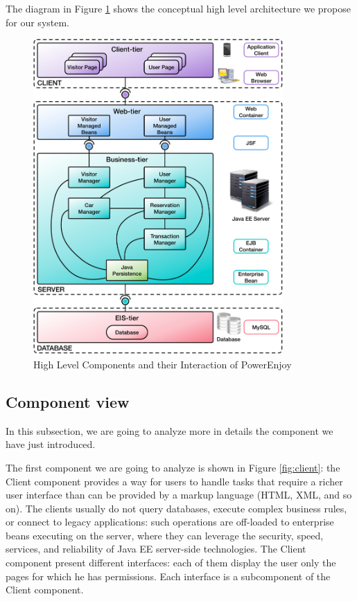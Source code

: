 The diagram in Figure \ref{fig:high-comp} shows the conceptual high level architecture we propose for our system.
\vspace{18pt}
\begin{figure}[htbp]
\centering
\includegraphics[width=0.85\textwidth]{Images/HighLevelComponents.pdf}
\vspace{10pt}
\caption{High Level Components and their Interaction of PowerEnjoy}
\label{fig:high-comp}
\end{figure}
\clearpage

\subsection{Component view} \label{subsec:comp-view}
In this subsection, we are going to analyze more in details the component we have just introduced.

\newline
The first component we are going to analyze is shown in Figure \ref{fig:client}: the Client component provides a way for users to handle tasks that require a richer user interface than can be provided by a markup language (HTML, XML, and so on).
The clients usually do not query databases, execute complex business rules, or connect to legacy applications: such operations are off-loaded to enterprise beans executing on the server, where they can leverage the security, speed, services, and reliability of Java EE server-side technologies.
The Client component present different interfaces: each of them display the user only the pages for which he has permissions. 
Each interface is a subcomponent of the Client component.

